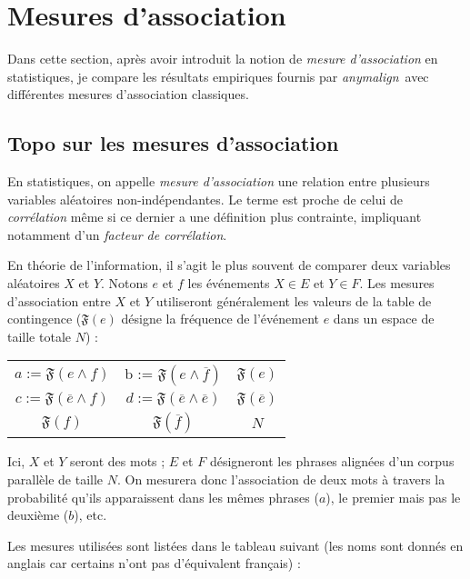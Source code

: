 \documentclass[a4paper,10pt]{article}
\newcommand{\anym}{\emph{anymalign}}
\begin{document}
\section{Mesures d'association}

Dans cette section, après avoir introduit la notion de \emph{mesure d'association} en statistiques, je compare les résultats empiriques fournis par \anym~avec différentes mesures d'association classiques.

\subsection{Topo sur les mesures d'association}

En statistiques, on appelle \emph{mesure d'association} une relation entre plusieurs variables aléatoires non-indépendantes. Le terme est proche de celui de \emph{corrélation} même si ce dernier a une définition plus contrainte, impliquant notamment d'un \emph{facteur de corrélation}.

En théorie de l'information, il s'agit le plus souvent de comparer deux variables aléatoires $X$ et $Y$. Notons $e$ et $f$ les événements $X \in E$ et $Y \in F$. Les mesures d'association entre $X$ et $Y$ utiliseront généralement les valeurs de la table de contingence ($\mathfrak{F}(e)$ désigne la fréquence de l'événement $e$ dans un espace de taille totale $N$) :

\begin{tabular}{|cc|c|}
\hline
$a := \mathfrak{F}(e\wedge f)$ & b := $\mathfrak{F}(e\wedge\overline{f})$ & $\mathfrak{F}(e)$ \\
$c := \mathfrak{F}(\overline{e}\wedge f)$ & $d := \mathfrak{F}(\overline{e}\wedge\overline{e})$ & $\mathfrak{F}(\overline{e})$ \\
\hline
$\mathfrak{F}(f)$ & $\mathfrak{F}(\overline{f})$ & $N$ \\
\hline
\end{tabular}


Ici, $X$ et $Y$ seront des mots ; $E$ et $F$ désigneront les phrases alignées d'un corpus parallèle de taille $N$. On mesurera donc l'association de deux mots à travers la probabilité qu'ils apparaissent dans les mêmes phrases ($a$), le premier mais pas le deuxième ($b$), etc.

Les mesures utilisées sont listées dans le tableau suivant (les noms sont donnés en anglais car certains n'ont pas d'équivalent français) :
\end{document}
